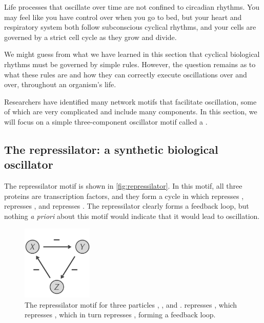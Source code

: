 Life processes that oscillate over time are not confined to circadian rhythms. You may feel like you have control over when you go to bed, but your heart and respiratory system both follow subconscious cyclical rhythms, and your cells are governed by a strict cell cycle as they grow and divide.

We might guess from what we have learned in this section that cyclical biological rhythms must be governed by simple rules. However, the question remains as to what these rules are and how they can correctly execute oscillations over and over, throughout an organism's life.

Researchers have identified many network motifs that facilitate oscillation, some of which are very complicated and include many components. In this section, we will focus on a simple three-component oscillator motif called a .

\FloatBarrier
{}
\subsection{The repressilator: a synthetic biological oscillator}

The repressilator motif is shown in \autoref{fig:repressilator}. In this motif, all three proteins are transcription factors, and they form a cycle in which  represses ,  represses , and  represses . The repressilator clearly forms a feedback loop, but nothing \textit{a priori} about this motif would indicate that it would lead to oscillation.\\

\begin{figure}[h]
\centering
\mySfFamily
\includegraphics[width = 0.3\textwidth]{../images/repressilator.png}
\caption{The repressilator motif for three particles , , and .  represses , which represses , which in turn represses , forming a feedback loop.}
\label{fig:repressilator}
\end{figure}

